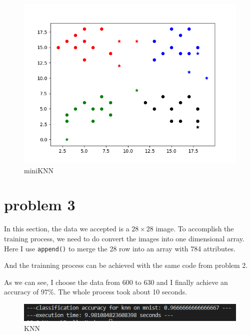 \documentclass[conference]{IEEEtran}
\begin{document}
\begin{figure}[H]
    \centerline{\includegraphics[scale=0.5]{Pic/miniknn.png}}
    \caption{miniKNN}
\end{figure}

\section*{problem 3}
In this section, the data we accepted is a $28\times 28$ image.
To accomplish the training process, we need to do convert the
images into one dimensional array. Here I use \verb|append()|
to merge the 28 row into an array with 784 attributes.

And the trainning process can be achieved with the same code 
from problem 2.

As we can see, I choose the data from 600 to 630 and I finally
achieve an accuracy of $97\%$. The whole process took about 10
seconds.

\begin{figure}[H]
    \centerline{\includegraphics[scale=0.7]{Pic/knn.png}}
    \caption{KNN}
\end{figure}
\end{document}
